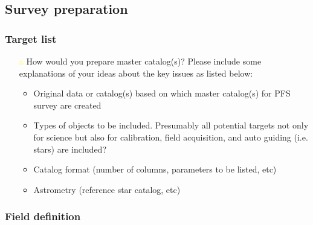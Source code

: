 \documentclass[a4paper,notitlepage]{article}
\newcommand{\colm}[1]{\textcolor{yellow}{#1}}
\begin{document}
\subsection{Survey preparation}

\subsubsection{Target list}

\begin{enumerate}
 \item[\colm{a}] How would you prepare master catalog(s)?  Please
          include some explanations of your ideas about the key
          issues as listed below:
          \begin{itemize}
           \item Original data or catalog(s) based on which master
             catalog(s) for PFS survey are created
           \item Types of objects to be included. Presumably all
             potential targets not only for science but also for
             calibration, field acquisition, and auto guiding
             (i.e. stars) are included?
           \item Catalog format (number of columns, parameters to be
             listed, etc)
           \item Astrometry (reference star catalog, etc)
          \end{itemize}
\end{enumerate}

\subsubsection{Field definition}
\end{document}

